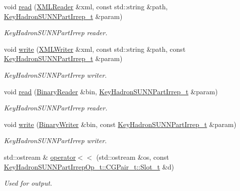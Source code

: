 \begin{DoxyCompactItemize}
void \mbox{\hyperlink{namespaceHadron_a4cc74936761dd0dad429189f523b1432}{read}} (\mbox{\hyperlink{classADATXML_1_1XMLReader}{X\+M\+L\+Reader}} \&xml, const std\+::string \&path, \mbox{\hyperlink{structHadron_1_1KeyHadronSUNNPartIrrep__t}{Key\+Hadron\+S\+U\+N\+N\+Part\+Irrep\+\_\+t}} \&param)
\begin{DoxyCompactList}\small\item\em Key\+Hadron\+S\+U\+N\+N\+Part\+Irrep reader. \end{DoxyCompactList}\item 
void \mbox{\hyperlink{namespaceHadron_a4d280edd65eda86698eae0d619c81a47}{write}} (\mbox{\hyperlink{classADATXML_1_1XMLWriter}{X\+M\+L\+Writer}} \&xml, const std\+::string \&path, const \mbox{\hyperlink{structHadron_1_1KeyHadronSUNNPartIrrep__t}{Key\+Hadron\+S\+U\+N\+N\+Part\+Irrep\+\_\+t}} \&param)
\begin{DoxyCompactList}\small\item\em Key\+Hadron\+S\+U\+N\+N\+Part\+Irrep writer. \end{DoxyCompactList}\item 
void \mbox{\hyperlink{namespaceHadron_a067d20ab6ec9071306d6db3a7e7cb4fd}{read}} (\mbox{\hyperlink{classADATIO_1_1BinaryReader}{Binary\+Reader}} \&bin, \mbox{\hyperlink{structHadron_1_1KeyHadronSUNNPartIrrep__t}{Key\+Hadron\+S\+U\+N\+N\+Part\+Irrep\+\_\+t}} \&param)
\begin{DoxyCompactList}\small\item\em Key\+Hadron\+S\+U\+N\+N\+Part\+Irrep reader. \end{DoxyCompactList}\item 
void \mbox{\hyperlink{namespaceHadron_a5a34021fb508d068cf35d125eef2e1b4}{write}} (\mbox{\hyperlink{classADATIO_1_1BinaryWriter}{Binary\+Writer}} \&bin, const \mbox{\hyperlink{structHadron_1_1KeyHadronSUNNPartIrrep__t}{Key\+Hadron\+S\+U\+N\+N\+Part\+Irrep\+\_\+t}} \&param)
\begin{DoxyCompactList}\small\item\em Key\+Hadron\+S\+U\+N\+N\+Part\+Irrep writer. \end{DoxyCompactList}\item 
std\+::ostream \& \mbox{\hyperlink{namespaceHadron_adfa3adbdb4aad36d2051cad402c7266e}{operator$<$$<$}} (std\+::ostream \&os, const \mbox{\hyperlink{structHadron_1_1KeyHadronSUNNPartIrrepOp__t_1_1CGPair__t_1_1Slot__t}{Key\+Hadron\+S\+U\+N\+N\+Part\+Irrep\+Op\+\_\+t\+::\+C\+G\+Pair\+\_\+t\+::\+Slot\+\_\+t}} \&d)
\begin{DoxyCompactList}\small\item\em Used for output. \end{DoxyCompactList}\item 

\end{DoxyCompactItemize}
